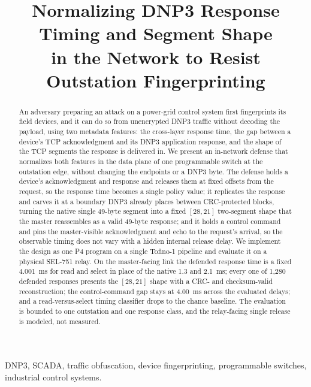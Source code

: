 \documentclass[conference]{IEEEtran}
\begin{document}
\title{Normalizing DNP3 Response Timing and Segment Shape\\ in the Network to Resist Outstation Fingerprinting}

\author{
}

\maketitle

\begin{abstract}
An adversary preparing an attack on a power-grid control system first fingerprints its field devices,
and it can do so from unencrypted DNP3 traffic without decoding the payload, using two metadata
features: the cross-layer response time, the gap between a device's TCP acknowledgment and its DNP3
application response, and the shape of the TCP segments the response is delivered in. We present an
in-network defense that normalizes both features in the data plane of one programmable switch at the
outstation edge, without changing the endpoints or a DNP3 byte. The defense holds a device's
acknowledgment and response and releases them at fixed offsets from the request, so the response time
becomes a single policy value; it replicates the response and carves it at a boundary DNP3 already
places between CRC-protected blocks, turning the native single 49-byte segment into a fixed $[28,21]$
two-segment shape that the master reassembles as a valid 49-byte response; and it holds a control
command and pins the master-visible acknowledgment and echo to the request's arrival, so the
observable timing does not vary with a hidden internal release delay. We implement the design as one
P4 program on a single Tofino-1 pipeline and evaluate it on a physical SEL-751 relay. On the
master-facing link the defended response time is a fixed 4.001~ms for read and select in place of the
native 1.3 and 2.1~ms; every one of 1{,}280 defended responses presents the $[28,21]$ shape with a
CRC- and checksum-valid reconstruction; the control-command gap stays at 4.00~ms across the evaluated
delays; and a read-versus-select timing classifier drops to the chance baseline. The evaluation is
bounded to one outstation and one response class, and the relay-facing single release is modeled, not
measured.
\end{abstract}

\begin{IEEEkeywords}
DNP3, SCADA, traffic obfuscation, device fingerprinting, programmable switches, industrial control
systems.
\end{IEEEkeywords}
\end{document}

